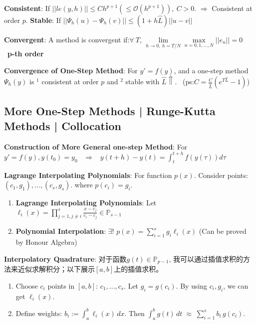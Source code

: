 \documentclass[9pt]{article}
\begin{document}
\textbf{Consistent}: {\small If $||le(y,h)||\leq Ch^{p+1} (\leq \mathcal{O}(h^{p+1})), \ C>0$. $\Rightarrow$ Consistent at order $p$.} \quad \textbf{Stable}: If $||\Psi_h(u)-\Psi_h(v)||\leq(1+h\widehat{L})||u-v||$

\textbf{Convergent}: {\small A method is convergent if:$\forall \ T$, $\lim\limits_{h\to0,\ h=T/N}\max\limits_{n=0,1,...,N}||e_n||=0$} \quad \quad {} \ {\tiny \textbf{p-th order}}

\vspace{-2pt}
\textbf{Convergence of One-Step Method}: {\small For $y'=f(y)$, and a one-step method $\Psi_h(y)$ is $^1$ consistent at order $p$ and $^2$ stable with $\widehat{L}\Uparrow$.} \ {\tiny (ps:$C=\frac{C}{\widehat{L}}(e^{T\widehat{L}}-1)$)}


\subsection{More One-Step Methods | Runge-Kutta Methods | Collocation} %

\textbf{Construction of More General one-step Method}: For $y'=f(y),y(t_0)=y_0$ \ $\Rightarrow$ \ $y(t+h)-y(t)=\int^{t+h}_tf(y(\tau))d\tau$

\textbf{Lagrange Interpolating Polynomials}: For function $p(x)$. Consider points: $(c_1,g_1),...,(c_s,g_s)$. where $p(c_i)=g_i$.

\begin{enumerate}[itemsep=-2pt, topsep=-1pt]
    \item \textbf{Lagrange Interpolating Polynomials}: Let $\ell_{i}(x)=\prod_{j=1,j\ne i}^{s}\frac{x-c_j}{c_i-c_j}\in\mathbb{P}_{s-1}$
    \item \textbf{Polynomial Interpolation}: $\exists!$ $p(x)=\sum_{i=1}^{s}g_i\ell_i(x)$ {\tiny (Can be proved by Honour Algebra)}
\end{enumerate}

\vspace{1pt}
\textbf{Interpolatory Quadrature}: {\footnotesize 对于函数$g(t)\in\mathbb{P}_{p-1}$, 我可以通过插值求积的方法来近似求解积分；以下展示$[a,b]$上的插值求积。}

\begin{enumerate}[itemsep=-2pt, topsep=-1pt]
    \item Choose $c_i$ points in $[a,b]$: $c_1,\dots,c_s$. \quad Let $g_i = g(c_i)$. \quad By using $c_i,g_i$, we can get $\ell_i(x)$.
    \item Define weights: $b_i := \int_a^b \ell_i(x)\,dx$. \quad Then $\int_a^b g(t)\,dt \;\approx\;\sum_{i=1}^{s} b_i\,g(c_i)$.
\end{enumerate}
\end{document}
